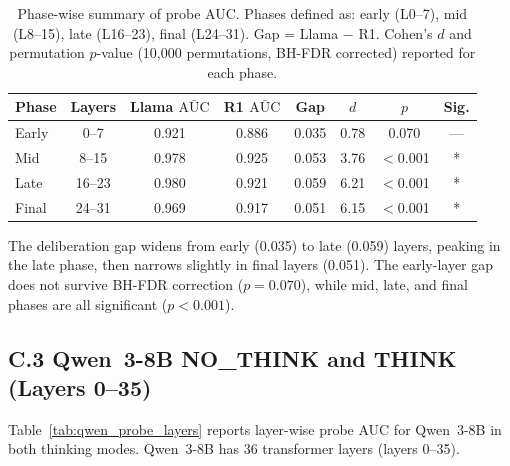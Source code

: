 \documentclass{article}
\begin{document}
\begin{table}[ht]
\centering
\caption{Phase-wise summary of probe AUC.  Phases defined as: early
  (L0--7), mid (L8--15), late (L16--23), final (L24--31).  Gap =
  Llama $-$ R1.  Cohen's $d$ and permutation $p$-value (10{,}000
  permutations, BH-FDR corrected) reported for each phase.}
\label{tab:phase_summary}
\vspace{4pt}
\small
\begin{tabular}{lccccccc}
\toprule
\textbf{Phase} & \textbf{Layers} &
  \textbf{Llama $\bar{\mathrm{AUC}}$} & \textbf{R1 $\bar{\mathrm{AUC}}$} &
  \textbf{Gap} & \textbf{$d$} & \textbf{$p$} & \textbf{Sig.} \\
\midrule
Early & 0--7  & 0.921 & 0.886 & 0.035 & 0.78 & 0.070 & --- \\
Mid   & 8--15 & 0.978 & 0.925 & 0.053 & 3.76 & $<$0.001 & * \\
Late  & 16--23& 0.980 & 0.921 & 0.059 & 6.21 & $<$0.001 & * \\
Final & 24--31& 0.969 & 0.917 & 0.051 & 6.15 & $<$0.001 & * \\
\bottomrule
\end{tabular}
\end{table}

\noindent The deliberation gap widens from early (0.035) to late
(0.059) layers, peaking in the late phase, then narrows slightly in
final layers (0.051).  The early-layer gap does not survive BH-FDR
correction ($p = 0.070$), while mid, late, and final phases are all
significant ($p < 0.001$).

\subsection*{C.3 Qwen~3-8B NO\_THINK and THINK (Layers 0--35)}

Table~\ref{tab:qwen_probe_layers} reports layer-wise probe AUC for
Qwen~3-8B in both thinking modes.  Qwen~3-8B has 36 transformer
layers (layers 0--35).
\end{document}
